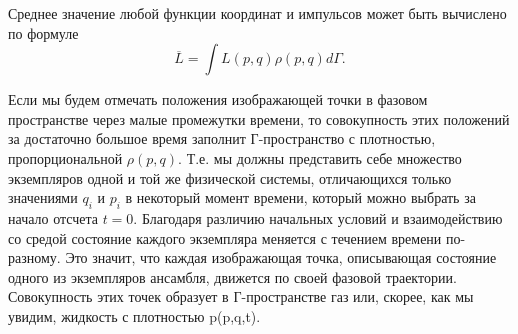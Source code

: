 \documentclass[14pt,a4paper]{scrartcl}
\begin{document}
 	\quad Среднее значение любой функции координат и импульсов может быть вычислено по формуле
 	$$\overline{L} = \int L(p,q)\rho(p,q)d\Gamma.$$
 	  
 	\quad Если мы будем отмечать положения изображающей точки в фазовом пространстве через малые промежутки времени, то совокупность этих положений за достаточно большое время заполнит Г-пространство с плотностью, пропорциональной $\rho(p,q)$. Т.е. мы должны представить себе множество экземпляров одной и той же физической системы, отличающихся только значениями $q_i$ и $p_i$ в некоторый момент времени, который можно выбрать за начало отсчета $ t =0 $. 
 	Благодаря различию начальных условий и взаимодействию со средой состояние каждого экземпляра меняется с течением времени по-разному. Это значит, что каждая изображающая точка, описывающая состояние одного из экземпляров ансамбля, движется по своей фазовой траектории. Совокупность этих точек образует в Г-пространстве газ или, скорее, как мы увидим, жидкость с плотностью p(p,q,t).
 	
\end{document}
